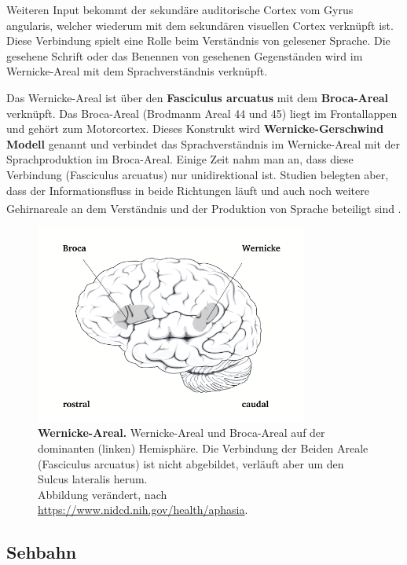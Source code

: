 \documentclass[12pt,a4paper,pdftex]{article}
\begin{document}
Weiteren Input bekommt der sekundäre auditorische Cortex vom Gyrus angularis, welcher wiederum mit dem sekundären visuellen Cortex verknüpft ist. Diese Verbindung spielt eine Rolle beim Verständnis von gelesener Sprache. Die gesehene Schrift oder das Benennen von gesehenen Gegenständen wird im Wernicke-Areal mit dem Sprachverständnis verknüpft. 

Das Wernicke-Areal ist über den \textbf{Fasciculus arcuatus}  mit dem \textbf{Broca-Areal}  verknüpft. Das Broca-Areal (Brodmanm Areal 44 und 45) liegt im Frontallappen und gehört zum Motorcortex. Dieses Konstrukt wird \textbf{Wernicke-Gerschwind Modell}  genannt und verbindet das Sprachverständnis im Wernicke-Areal mit der Sprachproduktion im Broca-Areal. Einige Zeit nahm man an, dass diese Verbindung (Fasciculus arcuatus) nur unidirektional ist. Studien belegten aber, dass der Informationsfluss in beide Richtungen läuft und auch noch weitere Gehirnareale an dem Verständnis und der Produktion von Sprache beteiligt sind \textsuperscript{\cite[60]{kandel2013principles}}.

\begin{figure}[H]
    \centering
    \includegraphics[width=0.8\textwidth]{pictures/auditory/Wernicke.png}
    \caption[Wernicke-Areal]{\textbf{Wernicke-Areal.} Wernicke-Areal und Broca-Areal auf der dominanten (linken) Hemisphäre. Die Verbindung der Beiden Areale (Fasciculus arcuatus) ist nicht abgebildet, verläuft aber um den Sulcus lateralis herum.\\
    Abbildung verändert, nach \url{https://www.nidcd.nih.gov/health/aphasia}.}
    \label{fig:Wernicke}
\end{figure}

\newpage
\subsection{Sehbahn}
\end{document}
